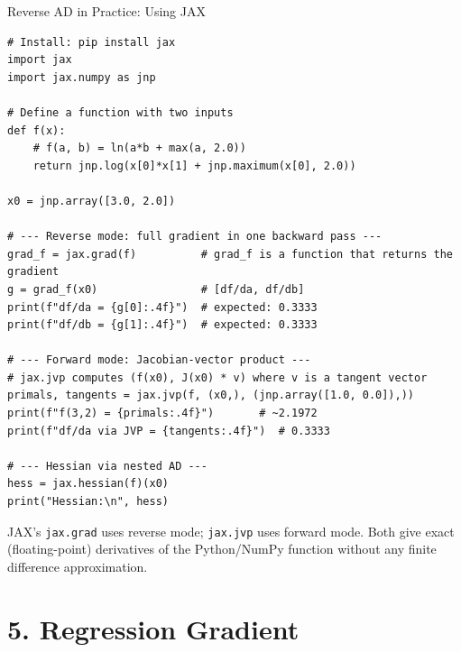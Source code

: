 \documentclass[aspectratio=169,10pt]{beamer}
\begin{document}
\begin{frame}[fragile]{Reverse AD in Practice: Using JAX}
\begin{lstlisting}[caption={Automatic differentiation with JAX --- both forward and reverse mode}]
# Install: pip install jax
import jax
import jax.numpy as jnp

# Define a function with two inputs
def f(x):
    # f(a, b) = ln(a*b + max(a, 2.0))
    return jnp.log(x[0]*x[1] + jnp.maximum(x[0], 2.0))

x0 = jnp.array([3.0, 2.0])

# --- Reverse mode: full gradient in one backward pass ---
grad_f = jax.grad(f)          # grad_f is a function that returns the gradient
g = grad_f(x0)                # [df/da, df/db]
print(f"df/da = {g[0]:.4f}")  # expected: 0.3333
print(f"df/db = {g[1]:.4f}")  # expected: 0.3333

# --- Forward mode: Jacobian-vector product ---
# jax.jvp computes (f(x0), J(x0) * v) where v is a tangent vector
primals, tangents = jax.jvp(f, (x0,), (jnp.array([1.0, 0.0]),))
print(f"f(3,2) = {primals:.4f}")       # ~2.1972
print(f"df/da via JVP = {tangents:.4f}")  # 0.3333

# --- Hessian via nested AD ---
hess = jax.hessian(f)(x0)
print("Hessian:\n", hess)
\end{lstlisting}

\medskip
JAX's \texttt{jax.grad} uses reverse mode; \texttt{jax.jvp} uses forward
mode.  Both give exact (floating-point) derivatives of the Python/NumPy
function without any finite difference approximation.
\end{frame}

\section{5. Regression Gradient}
\end{document}
